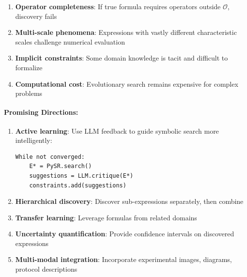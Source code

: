 \begin{enumerate}
\item \textbf{Operator completeness}: If true formula requires operators outside $\mathcal{O}$, discovery fails
\item \textbf{Multi-scale phenomena}: Expressions with vastly different characteristic scales challenge numerical evaluation
\item \textbf{Implicit constraints}: Some domain knowledge is tacit and difficult to formalize
\item \textbf{Computational cost}: Evolutionary search remains expensive for complex problems
\end{enumerate}

\paragraph{Promising Directions:}

\begin{enumerate}
\item \textbf{Active learning}: Use LLM feedback to guide symbolic search more intelligently:
\begin{verbatim}
While not converged:
    E* = PySR.search()
    suggestions = LLM.critique(E*)
    constraints.add(suggestions)
\end{verbatim}

\item \textbf{Hierarchical discovery}: Discover sub-expressions separately, then combine
\item \textbf{Transfer learning}: Leverage formulas from related domains
\item \textbf{Uncertainty quantification}: Provide confidence intervals on discovered expressions
\item \textbf{Multi-modal integration}: Incorporate experimental images, diagrams, protocol descriptions
\end{enumerate}


